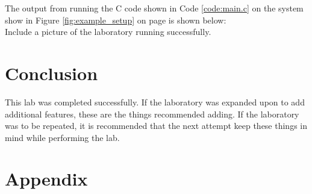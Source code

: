 The output from running the C code shown in Code \ref{code:main.c} on the system show in Figure \ref{fig:example_setup} on page \pageref{fig:example_setup} is shown below:\\
% 

Include a picture of the laboratory running successfully.\\

\section{Conclusion}
This lab was completed successfully.  If the laboratory was expanded upon to add additional features, these are the things recommended adding.  If the laboratory was to be repeated, it is recommended that the next attempt keep these things in mind while performing the lab.

\newpage
\section{Appendix}




